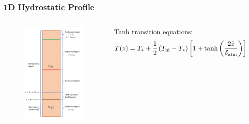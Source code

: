 \documentclass[
	11pt, %
]{beamer}
\begin{document}
\begin{frame}[allowframebreaks]
\frametitle{1D Hydrostatic Profile}
    \begin{columns}
            \begin{figure}
        		\includegraphics[width=1.0\linewidth]{1dprofile.pdf}
    	    \end{figure}
    	
    	
    	    \begin{block}{Tanh transition equations:}
    	       \begin{equation}
                    \scriptsize T(z) = T_* + \frac{1}{2}\left(T_{\mathrm{hi}} - T_*\right)\left[1 + \tanh{\left( \frac{2\tilde{z}}{\delta_{\mathrm{atm}}} \right)}\right]
                \end{equation}
            

\end{block}
\end{columns}
\end{frame}
\end{document}
